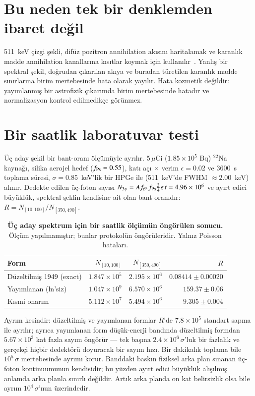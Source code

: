 \documentclass[letter]{aa}
\begin{document}
\section{Bu neden tek bir denklemden ibaret değil}
511~keV çizgi şekli, difüz pozitron annihilation akısını haritalamak ve
karanlık madde annihilation kanallarına kısıtlar koymak için
kullanılır~\citep{sy26,yoneda25}. Yanlış bir spektral şekil, doğrudan
çıkarılan akıya ve buradan türetilen karanlık madde sınırlarına birim
mertebesinde hata olarak yayılır. Hata kozmetik değildir: yayımlanmış bir
astrofizik çıkarımda birim mertebesinde hatadır ve normalizasyon
kontrol edilmedikçe görünmez.

\section{Bir saatlik laboratuvar testi}
Üç aday şekil bir bant-oranı ölçümüyle ayrılır. $5\,\mu$Ci
($1.85\times10^5$ Bq) $^{22}$Na kaynağı, silika aerojel hedef
($f_{\rm Ps} = 0.55$), katı açı $\times$ verim $\epsilon = 0.02$ ve
$3600$~s toplama süresi, $\sigma = 0.85$~keV'lik bir HPGe ile
(511~keV'de FWHM $\approx 2.00$~keV) alınır. Dedekte edilen üç-foton
sayısı
$N_{3\gamma} = A f_{\beta^+} f_{\rm Ps} \tfrac{3}{4}\epsilon\,t = 4.96\times 10^{6}$
ve ayırt edici büyüklük, spektral şeklin kendisine ait olan bant oranıdır:
$R = N_{[10,100]}/N_{[350,490]}$.

\begin{table}[!htbp]
\centering\footnotesize
\setlength{\tabcolsep}{2pt}
\caption{\textbf{Üç aday spektrum için bir saatlik ölçümün öngörülen sonucu.}
Ölçüm yapılmamıştır; bunlar protokolün öngörüleridir. Yalnız Poisson
hataları.}
\label{tab:na22}
\vspace{0.1cm}
\begin{tabular}{@{}lrrr@{}}
\toprule
Form & $N_{[10,100]}$ & $N_{[350,490]}$ & $R$ \\
\midrule
Düzeltilmiş 1949 (exact) & $1.847\times 10^{5}$ & $2.195\times 10^{6}$ & $0.08414\pm 0.00020$ \\
Yayımlanan (ln'siz) & $1.047\times 10^{9}$ & $6.570\times 10^{6}$ & $159.37\pm 0.06$ \\
Kısmi onarım & $5.112\times 10^{7}$ & $5.494\times 10^{6}$ & $9.305\pm 0.004$ \\
\bottomrule
\end{tabular}
\end{table}

Ayrım kesindir: düzeltilmiş ve yayımlanan formlar $R$'de
$7.8\times 10^{5}$ standart sapma ile ayrılır; ayrıca yayımlanan form
düşük-enerji bandında düzeltilmiş formdan $5.67\times 10^{3}$ kat fazla
sayım öngörür --- tek başına $2.4\times10^{6}\,\sigma$'luk bir fazlalık ve
gerçekçi hiçbir dedektörü doyuracak bir sayım hızı. Bir dakikalık
toplama bile $10^{5}\,\sigma$ mertebesinde ayrımı korur. Banddaki
baskın fiziksel arka plan sınanan üç-foton kontinuumunun kendisidir;
bu yüzden ayırt edici büyüklük alışılmış anlamda arka planla
sınırlı değildir. Artık arka planda on kat belirsizlik olsa bile ayrım
$10^{4}\,\sigma$'nun üzerindedir.
\end{document}
